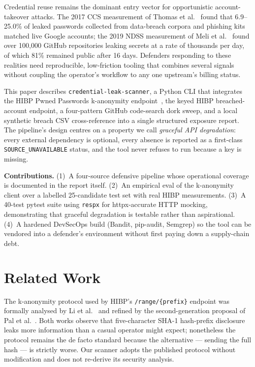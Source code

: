 \documentclass[conference]{IEEEtran}
\begin{document}
Credential reuse remains the dominant entry vector for opportunistic
account-takeover attacks. The 2017 CCS measurement of Thomas et
al.~\cite{thomas2017data} found that 6.9--25.0\% of leaked passwords
collected from data-breach corpora and phishing kits matched live
Google accounts; the 2019 NDSS measurement of Meli et
al.~\cite{meli2019gitleaks} found over 100{,}000 GitHub repositories
leaking secrets at a rate of thousands per day, of which 81\% remained
public after 16 days. Defenders responding to these realities need
reproducible, low-friction tooling that combines several signals
without coupling the operator's workflow to any one upstream's billing
status.

This paper describes \texttt{credential-leak-scanner}, a Python CLI
that integrates the HIBP Pwned Passwords k-anonymity
endpoint~\cite{li2019protocols}, the keyed HIBP breached-account
endpoint, a four-pattern GitHub code-search dork sweep, and a local
synthetic breach CSV cross-reference into a single structured
exposure report. The pipeline's design centres on a property we
call \emph{graceful API degradation}: every external dependency is
optional, every absence is reported as a first-class
\texttt{SOURCE\_UNAVAILABLE} status, and the tool never refuses to run
because a key is missing.

\textbf{Contributions.} (1)~A four-source defensive pipeline whose
operational coverage is documented in the report itself. (2)~An
empirical eval of the k-anonymity client over a labelled 25-candidate
test set with real HIBP measurements. (3)~A 40-test pytest suite using
\texttt{respx} for httpx-accurate HTTP mocking, demonstrating that
graceful degradation is testable rather than aspirational. (4)~A
hardened DevSecOps build (Bandit, pip-audit, Semgrep) so the tool can
be vendored into a defender's environment without first paying down a
supply-chain debt.

\section{Related Work}

The k-anonymity protocol used by HIBP's \texttt{/range/\{prefix\}}
endpoint was formally analysed by Li et
al.~\cite{li2019protocols} and refined by the second-generation
proposal of Pal et al.~\cite{pal2022might}. Both works observe that
five-character SHA-1 hash-prefix disclosure leaks more information
than a casual operator might expect; nonetheless the protocol remains
the de facto standard because the alternative --- sending the full
hash --- is strictly worse. Our scanner adopts the published protocol
without modification and does not re-derive its security analysis.
\end{document}
